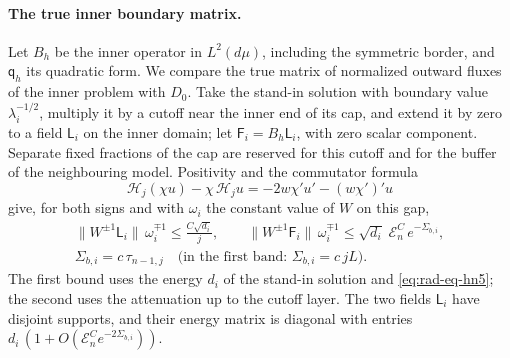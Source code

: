 \paragraph{The true inner boundary matrix.}
Let $B_h$ be the inner operator in $L^2(d\mu)$, including the
symmetric border, and $\mathsf q_h$ its quadratic form. We compare the
true matrix of normalized outward fluxes of the inner problem with
$D_0$. Take the stand-in solution with boundary value
$\lambda_i^{-1/2}$, multiply it by a cutoff near the inner end of its
cap, and extend it by zero to a field $\mathsf L_i$ on the inner
domain; let $\mathsf F_i=B_h\mathsf L_i$, with zero scalar
component. Separate fixed fractions of the cap are reserved for this
cutoff and for the buffer of the neighbouring model. Positivity and
the commutator formula
\[
 \mathscr H_j(\chi u)-\chi\,\mathscr H_ju
       =-2w\chi'u'-(w\chi')'u
\]
give, for both signs and with $\omega_i$ the constant value of $W$ on
this gap,
\begin{equation}\label{eq:rad-eq-tm6}
 \begin{gathered}
 \|W^{\pm1}\mathsf L_i\|\,\omega_i^{\mp1}
       \le\frac{C\sqrt{d_i}}{j},\qquad
 \|W^{\pm1}\mathsf F_i\|\,\omega_i^{\mp1}
       \le\sqrt{d_i}\;\mathcal E_n^C\,e^{-\Sigma_{b,i}},\\
 \Sigma_{b,i}=c\,\tau_{n-1,j}\quad\text{(in the first band: }
 \Sigma_{b,i}=c\,jL).
 \end{gathered}
\end{equation}
The first bound uses the energy $d_i$ of the stand-in solution and
\eqref{eq:rad-eq-hn5}; the second uses the attenuation up to the
cutoff layer. The two fields $\mathsf L_i$ have disjoint supports,
and their energy matrix is diagonal with entries
$d_i\,(1+O(\mathcal E_n^Ce^{-2\Sigma_{b,i}}))$.

